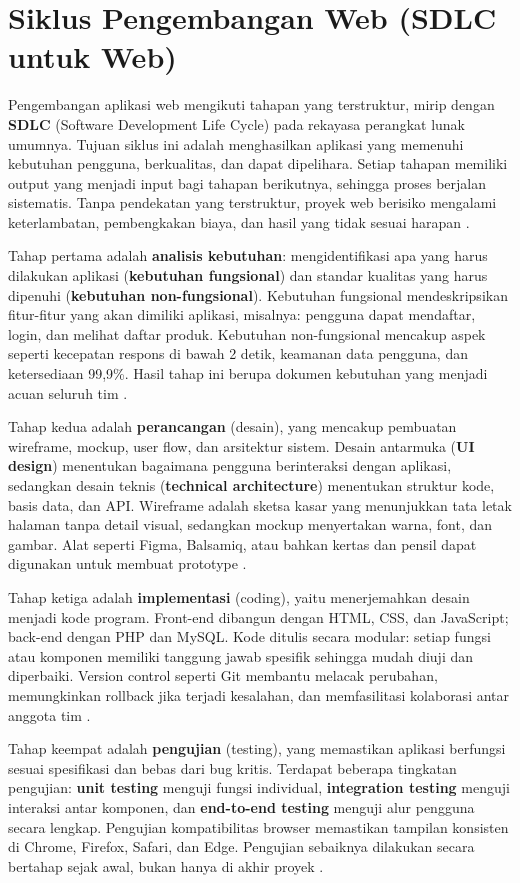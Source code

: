 ﻿\section{Siklus Pengembangan Web (SDLC untuk Web)}
Pengembangan aplikasi web mengikuti tahapan yang terstruktur, mirip dengan \textbf{SDLC} (Software Development Life Cycle) pada rekayasa perangkat lunak umumnya. Tujuan siklus ini adalah menghasilkan aplikasi yang memenuhi kebutuhan pengguna, berkualitas, dan dapat dipelihara. Setiap tahapan memiliki output yang menjadi input bagi tahapan berikutnya, sehingga proses berjalan sistematis. Tanpa pendekatan yang terstruktur, proyek web berisiko mengalami keterlambatan, pembengkakan biaya, dan hasil yang tidak sesuai harapan \cite{mdnLearn}.

Tahap pertama adalah \textbf{analisis kebutuhan}: mengidentifikasi apa yang harus dilakukan aplikasi (\textbf{kebutuhan fungsional}) dan standar kualitas yang harus dipenuhi (\textbf{kebutuhan non-fungsional}). Kebutuhan fungsional mendeskripsikan fitur-fitur yang akan dimiliki aplikasi, misalnya: pengguna dapat mendaftar, login, dan melihat daftar produk. Kebutuhan non-fungsional mencakup aspek seperti kecepatan respons di bawah 2 detik, keamanan data pengguna, dan ketersediaan 99,9\%. Hasil tahap ini berupa dokumen kebutuhan yang menjadi acuan seluruh tim \cite{webdevLearn}.

Tahap kedua adalah \textbf{perancangan} (desain), yang mencakup pembuatan wireframe, mockup, user flow, dan arsitektur sistem. Desain antarmuka (\textbf{UI design}) menentukan bagaimana pengguna berinteraksi dengan aplikasi, sedangkan desain teknis (\textbf{technical architecture}) menentukan struktur kode, basis data, dan API. Wireframe adalah sketsa kasar yang menunjukkan tata letak halaman tanpa detail visual, sedangkan mockup menyertakan warna, font, dan gambar. Alat seperti Figma, Balsamiq, atau bahkan kertas dan pensil dapat digunakan untuk membuat prototype \cite{webdevAccessibility}.

Tahap ketiga adalah \textbf{implementasi} (coding), yaitu menerjemahkan desain menjadi kode program. Front-end dibangun dengan HTML, CSS, dan JavaScript; back-end dengan PHP dan MySQL. Kode ditulis secara modular: setiap fungsi atau komponen memiliki tanggung jawab spesifik sehingga mudah diuji dan diperbaiki. Version control seperti Git membantu melacak perubahan, memungkinkan rollback jika terjadi kesalahan, dan memfasilitasi kolaborasi antar anggota tim \cite{mdnLearn}.

Tahap keempat adalah \textbf{pengujian} (testing), yang memastikan aplikasi berfungsi sesuai spesifikasi dan bebas dari bug kritis. Terdapat beberapa tingkatan pengujian: \textbf{unit testing} menguji fungsi individual, \textbf{integration testing} menguji interaksi antar komponen, dan \textbf{end-to-end testing} menguji alur pengguna secara lengkap. Pengujian kompatibilitas browser memastikan tampilan konsisten di Chrome, Firefox, Safari, dan Edge. Pengujian sebaiknya dilakukan secara bertahap sejak awal, bukan hanya di akhir proyek \cite{mdnToolsTesting}.

